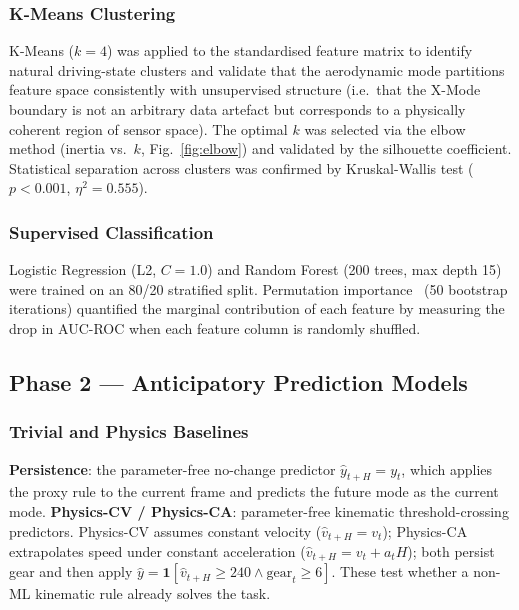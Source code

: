 \documentclass[conference,a4paper]{IEEEtran}
\begin{document}
\subsubsection{K-Means Clustering}
K-Means ($k{=}4$) was applied to the standardised feature matrix to identify natural
driving-state clusters and validate that the aerodynamic mode partitions feature space
consistently with unsupervised structure (i.e.\ that the X-Mode boundary is not an
arbitrary data artefact but corresponds to a physically coherent region of sensor space).
The optimal $k$ was selected via the elbow method (inertia vs.\ $k$,
Fig.~\ref{fig:elbow}) and validated by the silhouette coefficient.
Statistical separation across clusters was confirmed by Kruskal-Wallis test
($p{<}0.001$, $\eta^2 = 0.555$).

\subsubsection{Supervised Classification}
Logistic Regression (L2, $C=1.0$) and Random Forest (200 trees, max depth 15)
were trained on an 80/20 stratified split. Permutation importance~\cite{ref_breiman}
(50 bootstrap iterations) quantified the marginal contribution of each feature
by measuring the drop in AUC-ROC when each feature column is randomly shuffled.

\subsection{Phase 2 — Anticipatory Prediction Models}

\subsubsection{Trivial and Physics Baselines}
\textbf{Persistence}: the parameter-free no-change predictor $\hat{y}_{t+H} = y_t$,
which applies the proxy rule to the current frame and predicts the future mode as the
current mode.
\textbf{Physics-CV / Physics-CA}: parameter-free kinematic threshold-crossing predictors.
Physics-CV assumes constant velocity ($\hat{v}_{t+H} = v_t$); Physics-CA extrapolates
speed under constant acceleration ($\hat{v}_{t+H} = v_t + a_t H$); both persist gear and
then apply $\hat{y} = \mathbf{1}[\hat{v}_{t+H} \geq 240 \wedge \text{gear}_t \geq 6]$.
These test whether a non-ML kinematic rule already solves the task.
\end{document}
